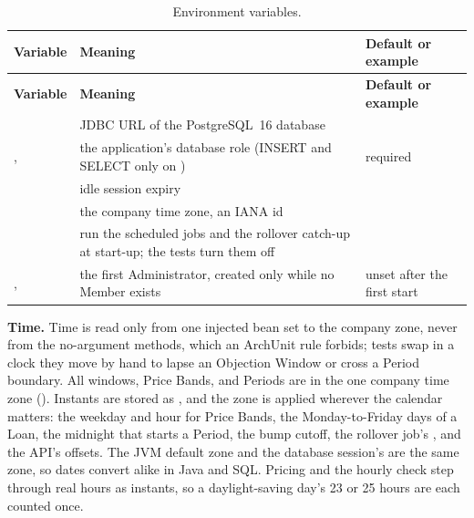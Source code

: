 {\footnotesize\renewcommand{\arraystretch}{1.08}
\begin{longtable}{@{}L{0.38\textwidth}L{0.36\textwidth}L{\tabcolsep\relax}@{}}
\caption{Environment variables.}\label{tab:cross-config}\\
\toprule
\textbf{Variable} & \textbf{Meaning} & \textbf{Default or example} \\
\midrule
\endfirsthead
\toprule
\textbf{Variable} & \textbf{Meaning} & \textbf{Default or example} \\
\midrule
\endhead
\bottomrule
\endlastfoot
{} & JDBC URL of the PostgreSQL~16 database &  \\
,  & the application's database role (INSERT and SELECT only on ) & required \\
 & idle session expiry &  \\
 & the company time zone, an IANA id &  \\
 & run the scheduled jobs and the rollover catch-up at start-up; the tests turn them off &  \\
,  & the first Administrator, created only while no Member exists & unset after the first start \\
\end{longtable}
}

\textbf{Time.} Time is read only from one injected  bean set to the company zone, never from the no-argument  methods, which an ArchUnit rule forbids; tests swap in a clock they move by hand to lapse an Objection Window or cross a Period boundary. All windows, Price Bands, and Periods are in the one company time zone (). Instants are stored as , and the zone is applied wherever the calendar matters: the weekday and hour for Price Bands, the Monday-to-Friday days of a Loan, the midnight that starts a Period, the bump cutoff, the rollover job's , and the API's offsets. The JVM default zone and the database session's  are the same zone, so dates convert alike in Java and SQL. Pricing and the hourly check step through real hours as instants, so a daylight-saving day's 23 or 25 hours are each counted once.

